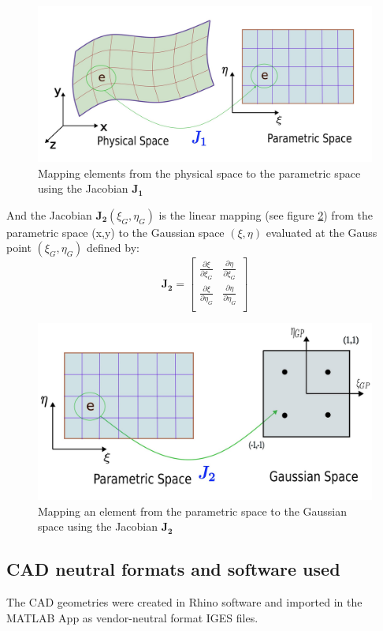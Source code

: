 \documentclass[12pt, a4paper]{report}
\begin{document}
\begin{figure}[H]
\centering
\includegraphics[width=0.8\linewidth]{Images/first_jacobiansvg.jpg}
\caption{Mapping elements from the physical space to the parametric space using the Jacobian $\mathbf{J_1}$ }
\label{fig:1st_jacob}
\end{figure}
And the Jacobian $\mathbf{J_2}(\xi_G,\eta_G)$ is the linear mapping (see figure \ref{fig:2nd_jacob}) from the parametric space (x,y) to the  Gaussian space $(\xi,\eta)$ evaluated at the Gauss point $(\xi_G,\eta_G)$ defined by:
\begin{equation}
    \mathbf{J_2}= \begin{bmatrix}
    \frac{\partial \xi}{\partial \xi_G} &  \frac{\partial \eta}{\partial \xi_G} \\
    \frac{\partial \xi}{\partial \eta_G} & \frac{\partial \eta}{\partial \eta_G}  \\
\end{bmatrix}
\end{equation}

\begin{figure}[H]
\centering
\includegraphics[width=0.8\linewidth]{Images/sec_jacobian.jpg}
\caption{Mapping an element from the parametric space to the  Gaussian space using the Jacobian $\mathbf{J_2}$ }
\label{fig:2nd_jacob}
\end{figure}
\subsection{CAD neutral formats and software used} \label{sec: neutral}
The CAD geometries were created in Rhino software and imported in the MATLAB App as vendor-neutral format IGES files. 
\end{document}
